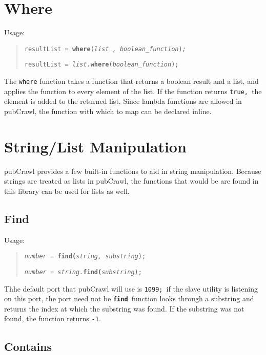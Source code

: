 \documentclass[oneside]{book}
\begin{document}
\section{Where}

Usage:
\begin{quote}
\texttt{resultList = }\texttt{\textbf{where}}\texttt{(}\texttt{\emph{list
, boolean\_function}}\texttt{)}\texttt{\emph{;}}

\texttt{resultList = }\texttt{\emph{list.}}\texttt{\textbf{where}}\texttt{(}\texttt{\emph{boolean\_function}}\texttt{);}
\end{quote}
The \texttt{where} function takes a function that returns a boolean
result and a list, and applies the function to every element of the
list. If the function returns \texttt{true, }the element is added
to the returned list. Since lambda functions are allowed in pubCrawl,
the function with which to map can be declared inline. 


\section{String/List Manipulation}

pubCrawl provides a few built-in functions to aid in string manipulation.
Because strings are treated as lists in pubCrawl, the functions that
would be are found in this library can be used for lists as well.


\subsection{Find}

Usage: 
\begin{quote}
\texttt{\emph{number = }}\texttt{\textbf{find(}}\texttt{\emph{string,
substring}}\texttt{);}

\texttt{\emph{number = string.}}\texttt{\textbf{find(}}\texttt{\emph{substring}}\texttt{);}
\end{quote}
Thhe default port that pubCrawl will use is \texttt{1099; }if the
slave utility is listening on this port, the port need not be \texttt{\textbf{find
}}function looks through a substring and returns the index at which
the substring was found. If the substring was not found, the function
returns \texttt{-1}.


\subsection{Contains }
\end{document}
